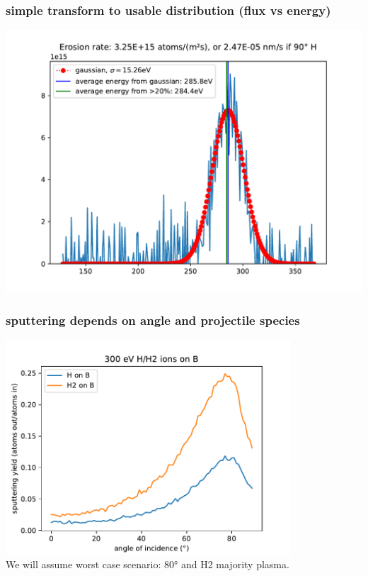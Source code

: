 \documentclass{beamer} %
\begin{document}
\begin{frame}
    \frametitle{simple transform to usable distribution (flux vs energy)}
    \includegraphics[width=\textwidth]{figures/ExampleIonDistribution.pdf}
\end{frame}
\begin{frame}
    \frametitle{sputtering depends on angle and projectile species}
    \includegraphics[width=0.8\textwidth]{figures/AngleDependance.pdf}\\
    We will assume worst case scenario: 80° and H2 majority plasma.
\end{frame}
\end{document}
